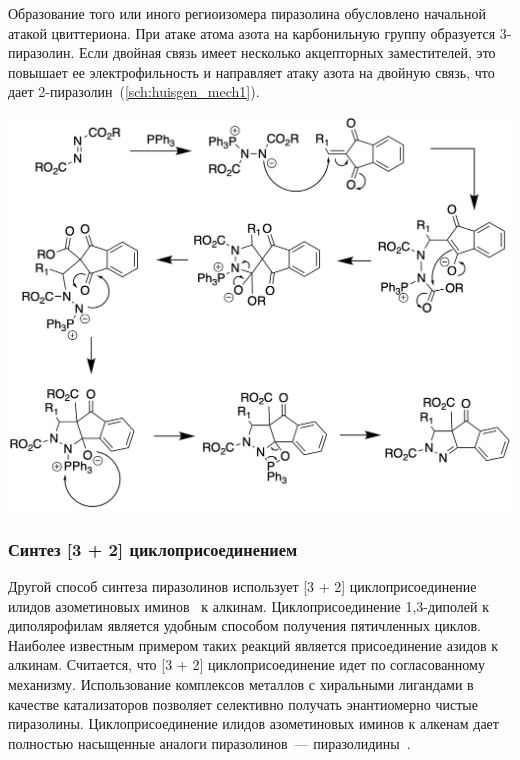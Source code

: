 Образование того или иного региоизомера пиразолина обусловлено начальной атакой цвиттериона.
При атаке атома азота на карбонильную группу образуется 3-пиразолин.
Если двойная связь имеет несколько акцепторных заместителей, это повышает ее электрофильность и направляет атаку азота на двойную связь, что дает 2-пиразолин~(\ref{sch:huisgen_mech1}).

\begin{scheme}[h!]
    \centering
    \includegraphics{sections/literature/img/huisgen_mech1.png}
    \caption{}
    \label{sch:huisgen_mech1}
\end{scheme}

\FloatBarrier{}

\subsubsection{Синтез [3 + 2] циклоприсоединением}

Другой способ синтеза пиразолинов использует [3 + 2] циклоприсоединение илидов азометиновых иминов~\textbf{} к алкинам. Циклоприсоединение 1,3-диполей к диполярофилам является удобным способом получения пятичленных циклов. Наиболее известным примером таких реакций является присоединение азидов к алкинам. Считается, что [3 + 2] циклоприсоединение идет по согласованному механизму. Использование комплексов металлов с хиральными лигандами в качестве катализаторов позволяет селективно получать энантиомерно чистые пиразолины. Циклоприсоединение илидов азометиновых иминов к алкенам дает полностью насыщенные аналоги пиразолинов~--- пиразолидины~\cite{Groselj2018}.


